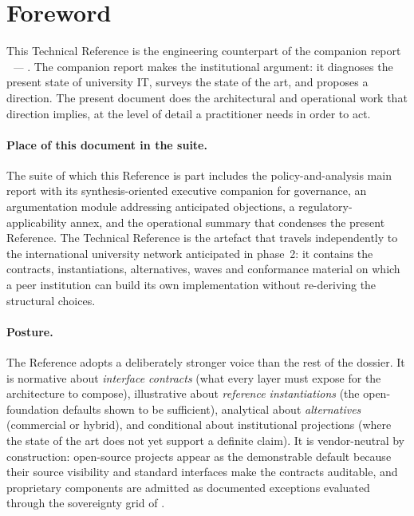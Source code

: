 
\section*{Foreword}

This Technical Reference is the engineering counterpart of the
companion report \emph{\suitpolicytitle\ --- \suitpolicysubtitle}. The companion report makes the institutional
argument: it diagnoses the present state of university IT, surveys
the state of the art, and proposes a direction. The present
document does the architectural and operational work that
direction implies, at the level of detail a practitioner needs in
order to act.

\paragraph{Place of this document in the suite.} The suite of
which this Reference is part includes the policy-and-analysis
main report with its synthesis-oriented executive companion for
governance, an argumentation module addressing anticipated
objections, a regulatory-applicability annex, and the operational
summary that condenses the present Reference. The Technical
Reference is the artefact that travels independently to the
international university network anticipated in phase~2: it
contains the contracts, instantiations, alternatives, waves and
conformance material on which a peer institution can build its
own implementation without re-deriving the structural choices.

\paragraph{Posture.} The Reference adopts a deliberately stronger
voice than the rest of the dossier. It is normative about
\emph{interface contracts} (what every layer must expose for the
architecture to compose), illustrative about \emph{reference
instantiations} (the open-foundation defaults shown to be
sufficient), analytical about \emph{alternatives} (commercial or
hybrid), and conditional about institutional projections (where
the state of the art does not yet support a definite claim). It
is vendor-neutral by construction: open-source projects appear as
the demonstrable default because their source visibility and
standard interfaces make the contracts auditable, and proprietary
components are admitted as documented exceptions evaluated through
the sovereignty grid of .


